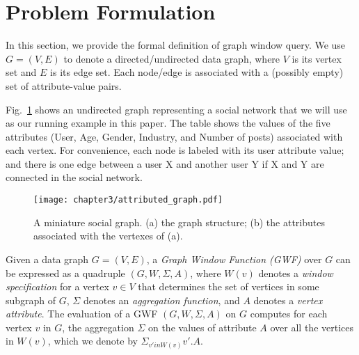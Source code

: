 \section{Problem Formulation}


In this section, we provide the formal definition of graph window query.
We use $G = (V,E)$ to denote a directed/undirected data graph, where $V$ is its vertex set and $E$ is its edge set.
Each node/edge is associated with a (possibly empty) set of attribute-value pairs.


Fig.~\ref{fig:attributed} shows an undirected graph representing a social network that we will use as our running example in this paper. 
The table shows the values of the five attributes (User, Age, Gender, Industry, and Number of posts) associated with each vertex. For convenience, each node is labeled with its user attribute value;
and there is one edge between a user X and another user Y if X and Y are connected in the social network.


\begin{figure}[h]
\centering
\texttt{[image: chapter3/attributed\_graph.pdf]}
	\caption{A miniature social graph. (a) the graph structure; (b) the attributes associated with the vertexes of (a).} 
	\label{fig:attributed}
\end{figure}

Given a data graph $G = (V,E)$,
a \emph{Graph Window Function (GWF)} over $G$ can be expressed 
as a quadruple $(G, W, \Sigma, A)$, where 
$W(v)$ denotes a \emph{window specification} for a vertex $v \in V$ 
that determines the set of vertices in some subgraph of $G$,
$\Sigma$ denotes an \emph{aggregation function}, and $A$ denotes 
a \emph{vertex attribute}.
The evaluation of a GWF $(G, W, \Sigma, A)$ on $G$
computes for each vertex $v$ in $G$, the aggregation $\Sigma$ on the 
values of attribute $A$  
over all the vertices in $W(v)$, which we denote by $\Sigma_{v' in W(v)} v'.A$.

